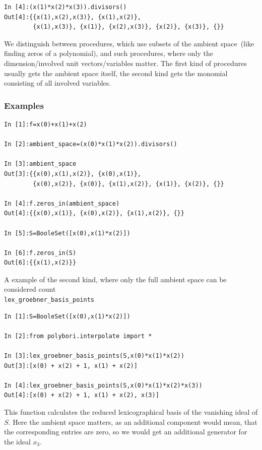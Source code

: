 \begin{lstlisting}
In [4]:(x(1)*x(2)*x(3)).divisors()
Out[4]:{{x(1),x(2),x(3)}, {x(1),x(2)}, 
        {x(1),x(3)}, {x(1)}, {x(2),x(3)}, {x(2)}, {x(3)}, {}}
\end{lstlisting}

We distinguish between procedures, which use subsets of the ambient space~(like
finding zeros of a polynomial),  and such procedures, where
only the dimension/involved unit vectors/variables matter.
The first kind of procedures usually gets the ambient space itself, the second kind gets the monomial consisting of all involved variables.

\subsubsection{Examples}
\begin{lstlisting}
In [1]:f=x(0)+x(1)+x(2)

In [2]:ambient_space=(x(0)*x(1)*x(2)).divisors()

In [3]:ambient_space
Out[3]:{{x(0),x(1),x(2)}, {x(0),x(1)}, 
        {x(0),x(2)}, {x(0)}, {x(1),x(2)}, {x(1)}, {x(2)}, {}}

In [4]:f.zeros_in(ambient_space)
Out[4]:{{x(0),x(1)}, {x(0),x(2)}, {x(1),x(2)}, {}}

In [5]:S=BooleSet([x(0),x(1)*x(2)])

In [6]:f.zeros_in(S)
Out[6]:{{x(1),x(2)}}
\end{lstlisting}

A example of the second kind, where only the full ambient space can be considered count\\
\lstinline|lex_groebner_basis_points|
\begin{lstlisting}
In [1]:S=BooleSet([x(0),x(1)*x(2)])

In [2]:from polybori.interpolate import *              

In [3]:lex_groebner_basis_points(S,x(0)*x(1)*x(2))
Out[3]:[x(0) + x(2) + 1, x(1) + x(2)]

In [4]:lex_groebner_basis_points(S,x(0)*x(1)*x(2)*x(3))
Out[4]:[x(0) + x(2) + 1, x(1) + x(2), x(3)]
\end{lstlisting}

This function calculates the reduced lexicographical \Groebner basis of the vanishing ideal of $S$.
Here the ambient space matters, as an additional component would mean, that the corresponding entries are zero, so we would get an additional generator for the ideal $x_3$.

